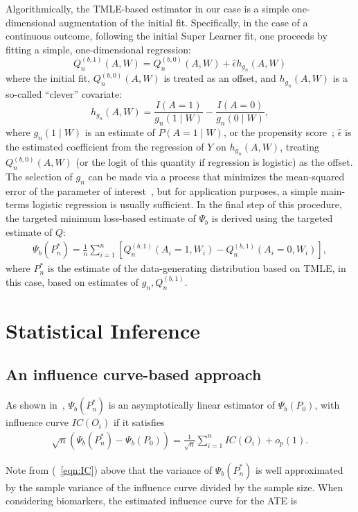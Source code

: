 Algorithmically, the TMLE-based estimator in our case is a simple
one-dimensional augmentation of the initial fit. Specifically, in the case of
a continuous outcome, following the initial Super Learner fit, one proceeds by
fitting a simple, one-dimensional regression:
$$
Q^{(b, 1)}_n(A, W) = Q^{(b, 0)}_n(A, W) + \hat{\epsilon} h_{g_n}(A, W)
$$
where the initial fit, $Q^{(b, 0)}_n(A, W)$ is treated as an offset, and
$h_{g_n}(A, W)$ is a so-called ``clever'' covariate:
$$
h_{g_n}(A, W) = \frac{I(A = 1)}{g_n(1 \mid W)} - \frac{I(A = 0)}{g_n(0 \mid W)}
,$$
where $g_n(1 \mid W)$ is an estimate of $P(A = 1 \mid W)$, or the propensity
score~\cite{rosenbaum1983central}; $\hat{\epsilon}$ is the estimated coefficient
from the regression of $Y$ on $h_{g_n}(A, W)$, treating $Q^{(b, 0)}_n(A, W)$ (or
the logit of this quantity if regression is logistic) as the offset. The
selection of $g_n$ can be made via a process that minimizes the mean-squared
error of the parameter of interest~\cite{gruber2010application}, but for
application purposes, a simple main-terms logistic regression is usually
sufficient. In the final step of this procedure, the targeted minimum loss-based
estimate of $\Psi_b$ is derived using the targeted estimate of $Q$:
\begin{eqnarray}
\Psi_b(P^*_n) = \frac{1}{n}\sum^{n}_{i = 1}[Q^{(b, 1)}_n(A_i = 1, W_i) -
  Q^{(b, 1)}_{n}(A_i = 0, W_i)],
\end{eqnarray}
where $P^*_n$ is the estimate of the data-generating distribution based on TMLE,
in this case, based on estimates of $g_n, Q^{(b,1)}_n$.

\section{Statistical Inference}\label{inference}

\subsection{An influence curve-based approach}\label{ic}

As shown in~\cite{van2011targeted}, $\Psi_b(P^*_n)$ is an asymptotically
linear estimator of $\Psi_b(P_0)$, with influence curve $IC(O_i)$ if it
satisfies
\begin{eqnarray}
\sqrt{n}(\Psi_b(P^*_n) - \Psi_b(P_0)) = \frac{1}{\sqrt{n}}\sum^{n}_{i =
  1}IC(O_i) + o_p(1).
\label{eqn:IC}
\end{eqnarray}

Note from (~\ref{eqn:IC}) above that the variance of $\Psi_b(P^*_n)$ is well
approximated by the sample variance of the influence curve divided by the sample
size. When considering biomarkers, the estimated influence curve for the ATE is

